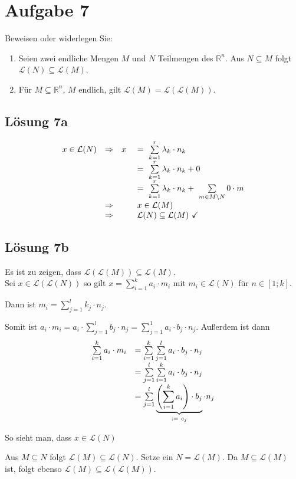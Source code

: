 \documentclass[main.tex]{subfiles}
\begin{document}
\section{Aufgabe 7}

Beweisen oder widerlegen Sie:
\begin{enumerate}
    \item Seien zwei endliche Mengen $M$ und $N$ Teilmengen des $\mathbb{R}^{n}$. Aus $N\subseteq M$ folgt $\mathcal{L}(N) \subseteq \mathcal{L}(M)$.
    \item Für $M\subseteq \mathbb{R}^{n}$, $M$ endlich, gilt $\mathcal{L}(M) = \mathcal{L}(\mathcal{L}(M))$.
\end{enumerate}

\subsection{Lösung 7a}

\begin{equation*}
    \begin{array}{ c c r l }
    x\in \mathcal{L}(N) & \Rightarrow  & x\  & =\ \sum\limits _{k=1}^{r} \lambda _{k} \cdotp n_{k}\\
     &  &  & =\ \sum\limits _{k=1}^{r} \lambda _{k} \cdotp n_{k} +0\\
     &  &  & =\ \sum\limits _{k=1}^{r} \lambda _{k} \cdotp n_{k} +\ \sum\limits _{m\in M\setminus N} 0\cdotp m\\
     & \Rightarrow  &  & x\in \mathcal{L}(M)\\
     & \Rightarrow  &  & \mathcal{L}(N) \subseteq \mathcal{L}(M) \ \checked
    \end{array}
\end{equation*}
    

\subsection{Lösung 7b}
Es ist zu zeigen, dass $\mathcal{L}(\mathcal{L}(M)) \subseteq \mathcal{L}(M)$.\\

Sei $x\in \mathcal{L}( \mathcal{L}( N))$ so gilt $x=\sum\limits _{i=1}^{k} a_{i} \cdotp m_{i}$ mit $m_{i} \in \mathcal{L}( N)$ für $n\in [ 1;k]$.

Dann ist $m_{i} =\sum\limits _{j=1}^{l} k_{j} \cdotp n_{j}$. 

Somit ist $a_{i} \cdotp m_{i} =a_{i} \cdotp \sum\limits _{j=1}^{l} b_{j} \cdotp n_{j} =\sum\limits _{j=1}^{1} a_{i} \cdotp b_{j} \cdotp n_{j}$. Außerdem ist dann
\begin{equation*}
    \begin{array}{ c l }
    \sum\limits _{i=1}^{k} a_{i} \cdotp m_{i} & =\sum\limits _{i=1}^{k}\sum\limits _{j=1}^{l} a_{i} \cdotp b_{j} \cdotp n_{j}\\
    & =\sum\limits _{j=1}^{l}\sum\limits _{i=1}^{k} a_{i} \cdotp b_{j} \cdotp n_{j}\\
    & =\sum\limits _{j=1}^{l}\underbrace{\left(\sum\limits _{i=1}^{k} a_{i}\right) \cdotp b_{j}}_{:=\ c_{j}} \cdotp n_{j}
    \end{array}
\end{equation*}

So sieht man, dass $x\in \mathcal{L}( N)$ \ \checkmark

Aus $M\subseteq N$ folgt $\mathcal{L}( M) \subseteq \mathcal{L}( N)$. Setze ein $N=\mathcal{L}( M)$. Da $M\subseteq \mathcal{L}( M)$ ist, folgt ebenso $\mathcal{L}( M) \subseteq \mathcal{L}( \mathcal{L}( M))$. \ \checkmark
\end{document}
